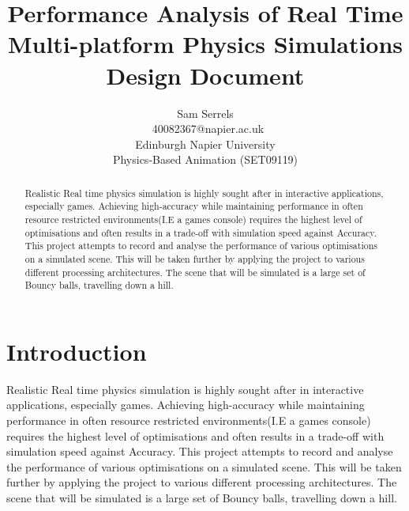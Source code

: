 \documentclass[conference]{acmsiggraph}
\title{Performance Analysis of Real Time Multi-platform Physics Simulations \\
	   Design Document}
\author{Sam Serrels\\\ 40082367@napier.ac.uk \\
Edinburgh Napier University\\
Physics-Based Animation (SET09119)}
\begin{document}

\maketitle

\begin{abstract}
Realistic Real time physics simulation is highly sought after in interactive applications, especially games. Achieving high-accuracy while maintaining performance in often resource restricted environments(I.E a games console) requires the highest level of optimisations and often results in a trade-off with simulation speed against Accuracy. This project attempts to record and analyse the performance of various optimisations on a simulated scene. This will be taken further by applying the project to various different processing architectures. The scene that will be simulated is a large set of Bouncy balls, travelling down a hill.
\end{abstract}

\keywordlist

\section{Introduction}

Realistic Real time physics simulation is highly sought after in interactive applications, especially games. Achieving high-accuracy while maintaining performance in often resource restricted environments(I.E a games console) requires the highest level of optimisations and often results in a trade-off with simulation speed against Accuracy. This project attempts to record and analyse the performance of various optimisations on a simulated scene. This will be taken further by applying the project to various different processing architectures. The scene that will be simulated is a large set of Bouncy balls, travelling down a hill.
\end{document}
